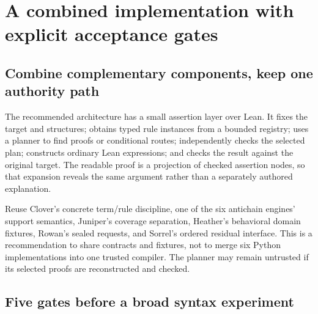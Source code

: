 \documentclass[11pt,letterpaper]{article}
\theoremstyle{definition}\newtheorem{definition}[proposition]{Definition}
\theoremstyle{remark}\newtheorem{remark}[proposition]{Remark}
\begin{document}
\section{A combined implementation with explicit acceptance gates}
\label{sec:implementation}

\subsection{Combine complementary components, keep one authority path}

The recommended architecture has a small assertion layer over Lean. It fixes
the target and structures; obtains typed rule instances from a bounded registry;
uses a planner to find proofs or conditional routes; independently checks the
selected plan; constructs ordinary Lean expressions; and checks the result
against the original target. The readable proof is a projection of checked
assertion nodes, so that expansion reveals the same argument rather than a
separately authored explanation.

Reuse Clover's concrete term/rule discipline, one of the six antichain engines'
support semantics, Juniper's coverage separation, Heather's behavioral domain
fixtures, Rowan's sealed requests, and Sorrel's ordered residual interface.
This is a recommendation to share contracts and fixtures, not to merge six
Python implementations into one trusted compiler. The planner may remain
untrusted if its selected proofs are reconstructed and checked.

\subsection{Five gates before a broad syntax experiment}
\end{document}
